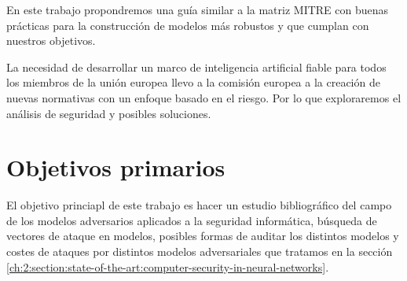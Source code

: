 En este trabajo propondremos una guía similar a la matriz \gls{MITRE} con buenas prácticas para la construcción de modelos más robustos y que cumplan con nuestros objetivos.

La necesidad de desarrollar un marco de inteligencia artificial fiable para todos los miembros de la unión europea llevo a la comisión europea a la creación de nuevas normativas con un enfoque basado en el riesgo.
Por lo que exploraremos el análisis de seguridad y posibles soluciones.


\section{Objetivos primarios}



El objetivo princiapl de este trabajo es hacer un estudio bibliográfico del campo de los modelos adversarios aplicados a la seguridad informática, búsqueda de vectores de ataque en modelos, posibles formas de auditar los distintos modelos y costes de ataques por distintos modelos adversariales que tratamos en la sección \ref{ch:2:section:state-of-the-art:computer-security-in-neural-networks}.

